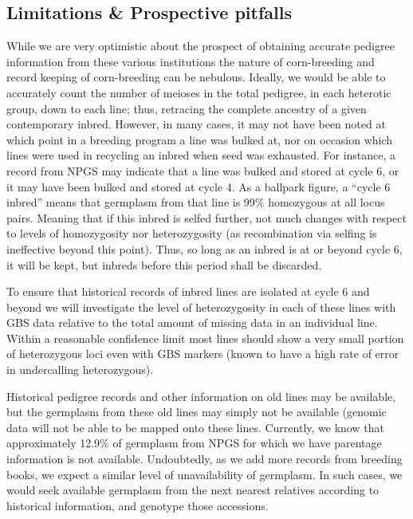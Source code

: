 \documentclass[12pt]{article}
\begin{document}
\subsection*{Limitations \& Prospective pitfalls}
While we are very optimistic about the prospect of obtaining accurate pedigree information from these various institutions the nature of corn-breeding and record keeping of corn-breeding can be nebulous. 
Ideally, we would be able to accurately count the number of meioses in the total pedigree, in each heterotic group, down to each line; thus, retracing the complete ancestry of a given contemporary inbred. 
However, in many cases, it may not have been noted at which point in a breeding program a line was bulked at, nor on occasion which lines were used in recycling an inbred when seed was exhausted. 
For instance, a record from NPGS may indicate that a line was bulked and stored at cycle 6, or it may have been bulked and stored at cycle 4. As a ballpark figure, a ``cycle 6 inbred'' means that germplasm from that line is 99\% homozygous at all locus pairs. 
Meaning that if this inbred is selfed further, not much changes with respect to levels of homozygosity nor heterozygosity (as recombination via selfing is ineffective beyond this point).  
Thus, so long as an inbred is at or beyond cycle 6, it will be kept, but inbreds before this period shall be discarded.

\par To ensure that historical records of inbred lines are isolated at cycle 6 and beyond we will investigate the level of heterozygosity in each of these lines with GBS data relative to the total amount of missing data in an individual line. Within a reasonable confidence limit most lines should show a very small portion of heterozygous loci even with GBS markers (known to have a high rate of error in undercalling heterozygous). 

\par Historical pedigree records and other information on old lines may be available, but the germplasm from these old lines may simply not be available (genomic data will not be able to be mapped onto these lines. Currently, we know that approximately 12.9\% of germplasm from NPGS for which we have parentage information is not available. Undoubtedly, as we add more records from breeding books, we expect a similar level of unavailability of germplasm.  In such cases, we would seek available germplasm from the next nearest relatives according to historical information, and genotype those accessions. 
\end{document}
